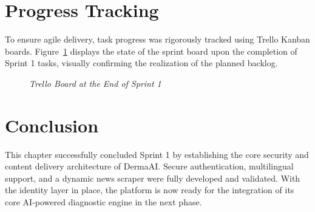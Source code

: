 \section{Progress Tracking}
To ensure agile delivery, task progress was rigorously tracked using Trello Kanban boards. Figure~\ref{fig:trello_sprint1} displays the state of the sprint board upon the completion of Sprint 1 tasks, visually confirming the realization of the planned backlog.

\begin{figure}[H]
    \centering
    \caption{\textit{Trello Board at the End of Sprint 1}}
    \label{fig:trello_sprint1}
\end{figure}

\section{Conclusion}
This chapter successfully concluded Sprint 1 by establishing the core security and content delivery architecture of DermaAI. Secure authentication, multilingual support, and a dynamic news scraper were fully developed and validated. With the identity layer in place, the platform is now ready for the integration of its core AI-powered diagnostic engine in the next phase.
